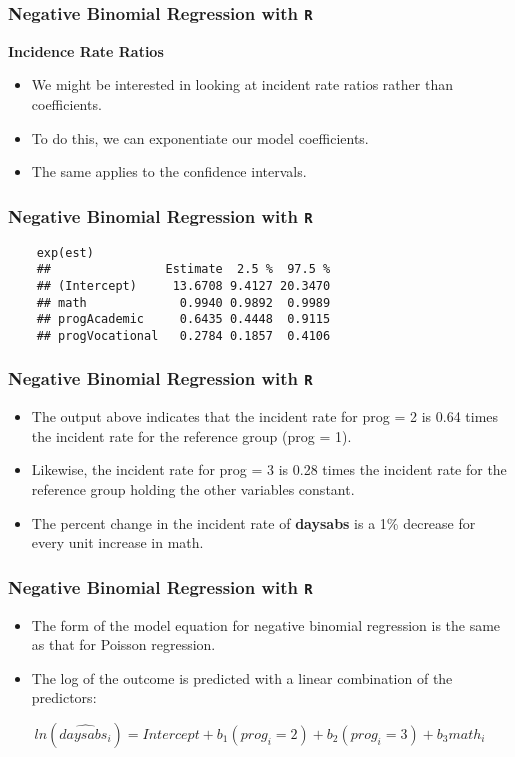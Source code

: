 \documentclass[MASTER.tex]{subfiles}
\begin{document}
\begin{frame}[fragile]
	\frametitle{Negative Binomial Regression with \texttt{R} }
	\Large
\textbf{Incidence Rate Ratios}
\begin{itemize}
\item	We might be interested in looking at incident rate ratios rather than coefficients. 
\item To do this, we can exponentiate our model coefficients. 
\item The same applies to the confidence intervals.
\end{itemize}
\end{frame}
\begin{frame}[fragile]
	\frametitle{Negative Binomial Regression with \texttt{R} }
	\large
	\begin{verbatim}	
	exp(est)
	##                Estimate  2.5 %  97.5 %
	## (Intercept)     13.6708 9.4127 20.3470
	## math             0.9940 0.9892  0.9989
	## progAcademic     0.6435 0.4448  0.9115
	## progVocational   0.2784 0.1857  0.4106
	\end{verbatim}
\end{frame}
\begin{frame}[fragile]
	\frametitle{Negative Binomial Regression with \texttt{R} }
	\Large
	\begin{itemize}
\item 	The output above indicates that the incident rate for prog = 2 is 0.64 times the incident rate for the reference group (prog = 1). 
\item Likewise, the incident rate for prog = 3 is 0.28 times the incident rate for the reference group holding the other variables constant. 
\item The percent change in the incident rate of \textbf{daysabs} is a 1\% decrease for every unit increase in math.
\end{itemize}
\end{frame}
\begin{frame}[fragile]
	\frametitle{Negative Binomial Regression with \texttt{R} }
	\Large
	\begin{itemize}
\item 	The form of the model equation for negative binomial regression is the same as that for Poisson regression. 
\item The log of the outcome is predicted with a linear combination of the predictors:
\end{itemize}
{
	\normalsize
\[ ln(\widehat{daysabs_i}) = Intercept + b_1(prog_i = 2) + b_2(prog_i = 3) + b_3math_i \] 
}
\end{frame}
\end{document}
